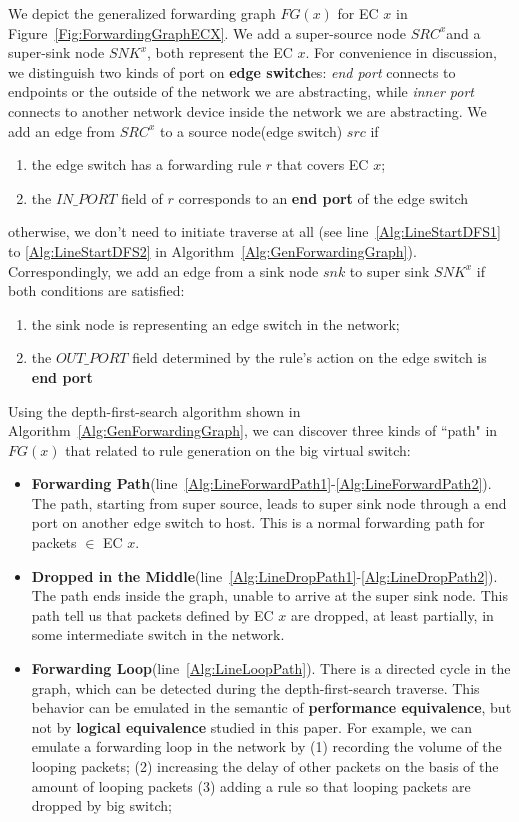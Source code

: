 We depict the generalized forwarding graph $FG(x)$ for EC $x$
in Figure~\ref{Fig:ForwardingGraphECX}.
We add a super-source node $SRC^x$and a super-sink node $SNK^x$, both represent the EC $x$.
For convenience in discussion, we distinguish two kinds of port on \textbf{edge switch}es:
\textit{end port} connects to endpoints or the outside of the network we are abstracting, while
\textit{inner port} connects to another network device inside the network we are abstracting.
We add an edge from $SRC^x$ to a source node(edge switch) $src$ if
\begin{enumerate}
\item the edge switch has a forwarding rule $r$ that covers EC $x$;
\item the $IN\_PORT$ field of $r$ corresponds to an \textbf{end port} of the edge switch
\end{enumerate}
otherwise, we don't need to initiate traverse at all
(see line~\ref{Alg:LineStartDFS1} to \ref{Alg:LineStartDFS2}
in Algorithm~\ref{Alg:GenForwardingGraph}).
Correspondingly, we add an edge from a sink node $snk$ to super sink $SNK^x$
if both conditions are satisfied:
\begin{enumerate}
\item the sink node is representing an edge switch in the network;
\item the $OUT\_PORT$ field determined by the rule's action on the edge switch is \textbf{end port}
\end{enumerate}

Using the depth-first-search algorithm shown in Algorithm~\ref{Alg:GenForwardingGraph},
we can discover three kinds of ``path" in $FG(x)$ that related to rule generation on
the big virtual switch:
\begin{itemize}
\item \textbf{Forwarding Path}(line~\ref{Alg:LineForwardPath1}-\ref{Alg:LineForwardPath2}).
        The path, starting from super source,
        leads to super sink node through a end port on another edge switch to host.
        This is a normal forwarding path for packets $\in$ EC $x$.
\item \textbf{Dropped in the Middle}(line~\ref{Alg:LineDropPath1}-\ref{Alg:LineDropPath2}).
        The path ends inside the graph, unable to arrive
        at the super sink node. This path tell us that packets
        defined by EC $x$ are dropped, at least partially,
        in some intermediate switch in the network.
\item \textbf{Forwarding Loop}(line~\ref{Alg:LineLoopPath}).
        There is a directed cycle in the graph, which can be
        detected during the depth-first-search traverse.
        This behavior can be emulated in the semantic of \textbf{performance equivalence},
        but not by \textbf{logical equivalence} studied in this paper.        
        For example, we can emulate a forwarding loop in the network by
        (1) recording the volume of the looping packets;
        (2) increasing the delay of other packets on the basis of the amount of looping packets
        (3) adding a rule so that looping packets are dropped by big switch;
\end{itemize}

